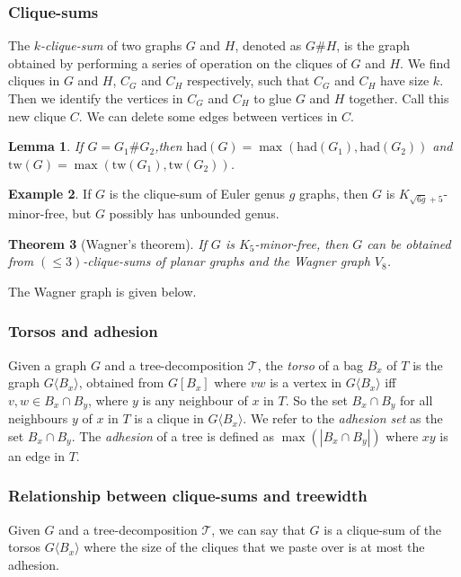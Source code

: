 \documentclass[]{report}
\newcommand{\tree}{\mathcal{T}}
\newcommand{\tw}{\text{tw}}
\newcommand{\had}{\text{had}}
\newtheorem{theorem}{Theorem}
\newtheorem{lemma}[theorem]{Lemma}
\theoremstyle{definition}
\newtheorem{example}[theorem]{Example}
\numberwithin{theorem}{section}
\numberwithin{equation}{section}
\begin{document}
\subsubsection{Clique-sums}\label{sssec:Clique_Sums}
The \textit{$k$-clique-sum} of two graphs $G$ and $H$, denoted as $G \# H$, is the graph obtained by performing a series of operation on the cliques of $G$ and $H$. We find cliques in $G$ and $H$, $C_G$ and $C_H$ respectively, such that $C_G$ and $C_H$ have size $k$. Then we identify the vertices in $C_G$ and $C_H$ to glue $G$ and $H$ together. Call this new clique $C$. We can delete some edges between vertices in $C$. 


\begin{lemma}
	If $G = G_1 \# G_2$,then $\had(G) = \max(\had(G_1), \had(G_2))$ and $\tw(G) = \max(\tw(G_1), \tw(G_2))$.
\end{lemma}

\begin{example}\label{ex:clique_sum_genus}
	If $G$ is the clique-sum of Euler genus $g$ graphs, then $G$ is $K_{\sqrt{6g} + 5}$-minor-free, but $G$ possibly has unbounded genus.
\end{example}

\begin{theorem}[Wagner's theorem\cite{wagnerUeberEigenschaftEbenen1937}]\label{thm:WagnersTheorem}
	If $G$ is $K_5$-minor-free, then $G$ can be obtained from $(\leq 3)$-clique-sums of planar graphs and the Wagner graph $V_8$.
\end{theorem}

The Wagner graph is given below.


\subsubsection{Torsos and adhesion}\label{sssec:Torsos and Adhesion}
Given a graph $G$ and a tree-decomposition $\tree$, the \textit{torso} of a bag $B_x$ of $T$ is the graph $G\langle B_x \rangle$, obtained from $G[B_x]$ where $vw$ is a vertex in $G\langle B_x \rangle$ iff $v,w \in B_x \cap B_y$, where $y$ is any neighbour of $x$ in $T$. So the set $B_x \cap B_y$ for all neighbours $y$ of $x$ in $T$ is a clique in $G\langle B_x \rangle$.
We refer to the \textit{adhesion set} as the set $B_x \cap B_y$. 
The \textit{adhesion} of a tree is defined as $\max(|B_x \cap B_y|)$ where $xy$ is an edge in $T$.

\subsubsection{Relationship between clique-sums and treewidth}
Given $G$ and a tree-decomposition $\tree$, we can say that $G$ is a clique-sum of the torsos $G\langle B_x \rangle$ where the size of the cliques that we paste over is at most the adhesion.
\end{document}
